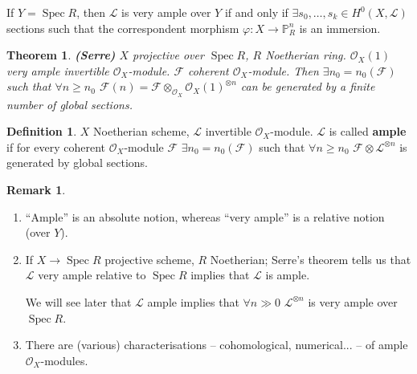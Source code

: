 \documentclass[12pt]{article}
\DeclareMathOperator{\Spec}{Spec}
\newtheorem*{theorem}{Theorem}
\theoremstyle{definition}
\newtheorem*{definition}{Definition}
\newtheorem*{remark}{Remark}
\theoremstyle{remark}
\newtheorem*{comment}{Comment}
\begin{document}
If $Y=\Spec R$, then $\mathcal{L}$ is very ample over $Y$ if and only if $\exists s_0,\ldots,s_k\in H^0(X,\mathcal{L})$ sections such that the correspondent morphism $\varphi:X\rightarrow\mathbb{P}_R^n$ is an immersion.

\begin{theorem}
\emph{\textbf{(Serre)}} $X$ projective over $\Spec R$, $R$ Noetherian ring. $\mathcal{O}_X(1)$ very ample invertible $\mathcal{O}_X$-module. $\mathcal{F}$ coherent $\mathcal{O}_X$-module. Then $\exists n_0=n_0(\mathcal{F})$ such that $\forall n\geq n_0$ $\mathcal{F}(n)=\mathcal{F}\otimes_{\mathcal{O}_X}\mathcal{O}_X(1)^{\otimes n}$ can be generated by a finite number of global sections.
\end{theorem}

\begin{definition}
$X$ Noetherian scheme, $\mathcal{L}$ invertible $\mathcal{O}_X$-module. $\mathcal{L}$ is called \textbf{ample} if for every coherent $\mathcal{O}_X$-module $\mathcal{F}$ $\exists n_0=n_0(\mathcal{F})$ such that $\forall n\geq n_0$ $\mathcal{F}\otimes\mathcal{L}^{\otimes n}$ is generated by global sections.
\end{definition}

\begin{remark}
\begin{enumerate}[label=\arabic*)]
\item ``Ample'' is an absolute notion, whereas ``very ample'' is a relative notion (over $Y$).

\item If $X\rightarrow\Spec R$ projective scheme, $R$ Noetherian; Serre's theorem tells us that $\mathcal{L}$ very ample relative to $\Spec R$ implies that $\mathcal{L}$ is ample.

We will see later that $\mathcal{L}$ ample implies that $\forall n\gg0$ $\mathcal{L}^{\otimes n}$ is very ample over $\Spec R$.

\item There are (various) characterisations -- cohomological, numerical... -- of ample $\mathcal{O}_X$-modules.
\end{enumerate}
\end{remark}

\begin{comment}
The notion of ``very ample'' has a direct geometric interpretation, which the concept of ``ample'' doesn't. However, there are good characterisations of ampleness that are very useful and easy to work with.
\end{comment}
\end{document}
